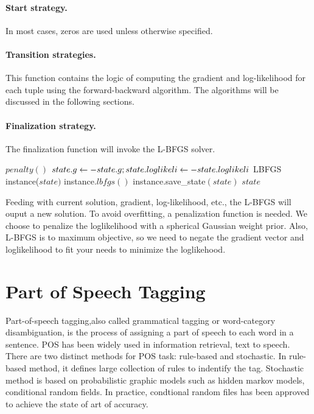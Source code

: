 \paragraph{Start strategy.}
In most cases, zeros are used unless otherwise specified.

\paragraph{Transition strategies.}
This function contains the logic of computing the gradient and log-likelihood for each tuple using the forward-backward
algorithm. The algorithms will be discussed in the following sections.

\paragraph{Finalization strategy.}
The finalization function will invoke the L-BFGS solver.\\

\begin{algorithm} \label{alg:CRF training}
\begin{algorithmic}[1]
        \State $penalty()$  
        \State $state.g \leftarrow -state.g; state.loglikeli\leftarrow -state.loglikeli$ 
        \State LBFGS instance($state)$ 
        \State instance.$lbfgs()$ 
        \State instance.save\_state$(state)$ 
        \State \Return $state$
\end{algorithmic}
\end{algorithm}

Feeding with current solution, gradient, log-likelihood, etc., the L-BFGS will ouput a new solution.
To avoid overfitting, a penalization function is needed. We choose to penalize the loglikelihood with a spherical Gaussian weight prior.
Also, L-BFGS is to maximum objective, so we need to negate the gradient vector and loglikelihood to fit your needs to minimize the loglikehood.

\section{Part of Speech Tagging}
Part-of-speech tagging,also called grammatical tagging or word-category disambiguation, is the process of assigning 
a part of speech to each word in a sentence. POS has been widely used in information retrieval, text to speech. There are two distinct methods for 
POS task: rule-based and stochastic.
In rule-based method, it defines large collection of rules to indentify the tag. Stochastic method is based on probabilistic 
graphic models such as hidden markov models, conditional random fields. In practice, condtional random files has been approved 
to achieve the state of art of accuracy.
